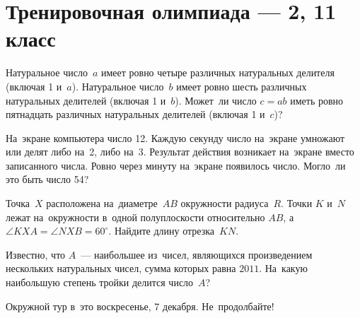 
\section*{Тренировочная олимпиада --- 2, 11 класс}


\begin{problems}

\item
Натуральное число~$a$ имеет ровно четыре различных натуральных делителя
(включая 1 и~$a$).
Натуральное число~$b$ имеет ровно шесть различных натуральных делителей
(включая 1 и~$b$).
Может~ли число $c = a b$ иметь ровно пятнадцать различных натуральных делителей
(включая 1 и~$c$)?

\item
На~экране компьютера число 12.
Каждую секунду число на~экране умножают или делят либо на~2, либо на~3.
Результат действия возникает на~экране вместо записанного числа.
Ровно через минуту на~экране появилось число.
Могло~ли это быть число 54?

\item
Точка~$X$ расположена на~диаметре~$AB$ окружности радиуса~$R$.
Точки $K$ и~$N$ лежат на~окружности в~одной полуплоскости относительно $AB$,
а~$\angle KXA = \angle NXB = 60^\circ$.
Найдите длину отрезка~$KN$.

\item
Известно, что $A$~--- наибольшее из~чисел, являющихся произведением нескольких
натуральных чисел, сумма которых равна $2011$.
На~какую наибольшую степень тройки делится число~$A$?

\end{problems}

\begin{center}\small\sffamily
Окружной тур в~это воскресенье, 7 декабря.
Не~продолбайте!
\end{center}

